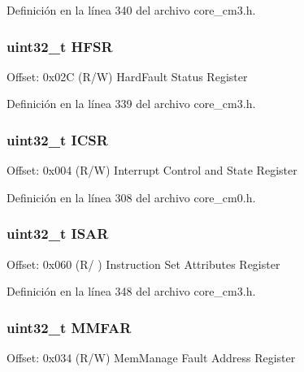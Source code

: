 Definición en la línea 340 del archivo core\+\_\+cm3.\+h.

\subsubsection[{\texorpdfstring{H\+F\+SR}{HFSR}}]{ uint32\+\_\+t H\+F\+SR}\hypertarget{struct_s_c_b___type_a87aadbc5e1ffb76d755cf13f4721ae71}{}\label{struct_s_c_b___type_a87aadbc5e1ffb76d755cf13f4721ae71}
Offset\+: 0x02C (R/W) Hard\+Fault Status Register 

Definición en la línea 339 del archivo core\+\_\+cm3.\+h.

\subsubsection[{\texorpdfstring{I\+C\+SR}{ICSR}}]{ uint32\+\_\+t I\+C\+SR}\hypertarget{struct_s_c_b___type_a8fec9e122b923822e7f951cd48cf1d47}{}\label{struct_s_c_b___type_a8fec9e122b923822e7f951cd48cf1d47}
Offset\+: 0x004 (R/W) Interrupt Control and State Register 

Definición en la línea 308 del archivo core\+\_\+cm0.\+h.

\subsubsection[{\texorpdfstring{I\+S\+AR}{ISAR}}]{ uint32\+\_\+t I\+S\+AR}\hypertarget{struct_s_c_b___type_abdeaebf965a4ca1dfde816cab85f1156}{}\label{struct_s_c_b___type_abdeaebf965a4ca1dfde816cab85f1156}
Offset\+: 0x060 (R/ ) Instruction Set Attributes Register 

Definición en la línea 348 del archivo core\+\_\+cm3.\+h.

\subsubsection[{\texorpdfstring{M\+M\+F\+AR}{MMFAR}}]{ uint32\+\_\+t M\+M\+F\+AR}\hypertarget{struct_s_c_b___type_a88820a178974aa7b7927155cee5c47ed}{}\label{struct_s_c_b___type_a88820a178974aa7b7927155cee5c47ed}
Offset\+: 0x034 (R/W) Mem\+Manage Fault Address Register 

